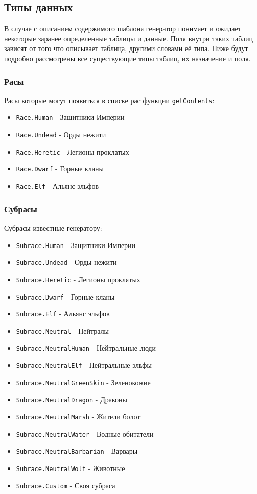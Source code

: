 \subsection{Типы данных}
В случае с описанием содержимого шаблона генератор понимает и ожидает некоторые заранее определенные таблицы и данные. Поля внутри таких таблиц зависят от того что описывает таблица, другими словами её типа. Ниже будут подробно рассмотрены все существующие типы таблиц, их назначение и поля.

\subsubsection{Расы}
\label{raceTypes}
Расы которые могут появиться в списке рас функции \texttt{getContents}:
\begin{itemize}
\item \texttt{Race.Human} - Защитники Империи
\item \texttt{Race.Undead} - Орды нежити
\item \texttt{Race.Heretic} - Легионы проклатых
\item \texttt{Race.Dwarf} - Горные кланы
\item \texttt{Race.Elf} - Альянс эльфов
\end{itemize}

\subsubsection{Субрасы}
\label{subraceTypes}
Субрасы известные генератору:
\begin{itemize}
\item \texttt{Subrace.Human} - Защитники Империи
\item \texttt{Subrace.Undead} - Орды нежити
\item \texttt{Subrace.Heretic} - Легионы проклятых
\item \texttt{Subrace.Dwarf} - Горные кланы
\item \texttt{Subrace.Elf} - Альянс эльфов
\item \texttt{Subrace.Neutral} - Нейтралы
\item \texttt{Subrace.NeutralHuman} - Нейтральные люди
\item \texttt{Subrace.NeutralElf} - Нейтральные эльфы
\item \texttt{Subrace.NeutralGreenSkin} - Зеленокожие
\item \texttt{Subrace.NeutralDragon} - Драконы
\item \texttt{Subrace.NeutralMarsh} - Жители болот
\item \texttt{Subrace.NeutralWater} - Водные обитатели
\item \texttt{Subrace.NeutralBarbarian} - Варвары
\item \texttt{Subrace.NeutralWolf} - Животные
\item \texttt{Subrace.Custom} - Своя субраса
\end{itemize}

